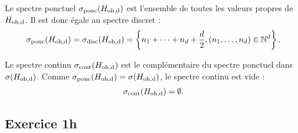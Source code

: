 Le spectre ponctuel $\sigma_{\text{ponc}}(H_\text{oh,d})$ est l'ensemble
de toutes les valeurs propres de $H_\text{oh,d}$. Il est donc égale
au spectre discret :
\begin{align}
    \sigma_{\text{ponc}}(H_\text{oh,d}) = \sigma_{\text{disc}}(H_\text{oh,d})
    = \left\{ n_1 + \cdots + n_d + \frac{d}{2}, (n_1, \dots, n_d)
    \in \mathbb{N}^d \right\}.
\end{align}

Le spectre continu $\sigma_{\text{cont}}(H_\text{oh,d})$ est le complémentaire
du spectre ponctuel dans $\sigma(H_\text{oh,d})$. Comme
$\sigma_{\text{ponc}}(H_\text{oh,d}) = \sigma(H_\text{oh,d})$, le spectre continu
est vide :
\begin{align}
    \sigma_{\text{cont}}(H_\text{oh,d}) = \emptyset.
\end{align}


\subsection*{Exercice 1h}

